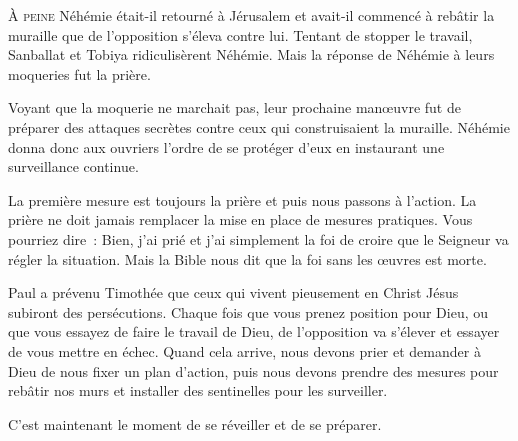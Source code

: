 


\lettrine{À}{ peine} Néhémie était-il retourné à Jérusalem
 et avait-il commencé à rebâtir la muraille que de l'opposition
 s'éleva contre lui.
 Tentant de stopper le travail, Sanballat et Tobiya ridiculisèrent Néhémie.
 Mais la réponse de Néhémie à leurs moqueries fut la prière.

Voyant que la moquerie ne marchait pas, leur prochaine man\oe{}uvre
 fut de préparer des attaques secrètes contre ceux qui construisaient
 la muraille.
 Néhémie donna donc aux ouvriers l'ordre de se protéger d'eux en instaurant
 une surveillance continue.

La première mesure est toujours la prière \ocadr{}et puis nous passons à l'action.
 La prière ne doit jamais remplacer la mise en place de mesures pratiques.
 Vous pourriez dire~:
 \Og Bien, j'ai prié et j'ai simplement la foi de croire que le Seigneur
 va régler la situation. \Fg{}
 Mais la Bible nous dit que la foi sans les \oe{}uvres est morte.


Paul a prévenu Timothée que ceux qui vivent pieusement en Christ Jésus
 subiront des persécutions.
 Chaque fois que vous prenez position pour Dieu,
 ou que vous essayez de faire le travail de Dieu,
 de l'opposition va s'élever et essayer de vous mettre en échec.
 Quand cela arrive, nous devons prier et demander à Dieu de nous fixer
 un plan d'action, puis nous devons prendre des mesures pour rebâtir
 nos murs et installer des sentinelles pour les surveiller.

C'est maintenant le moment de se réveiller et de se préparer. 


\dvrule






